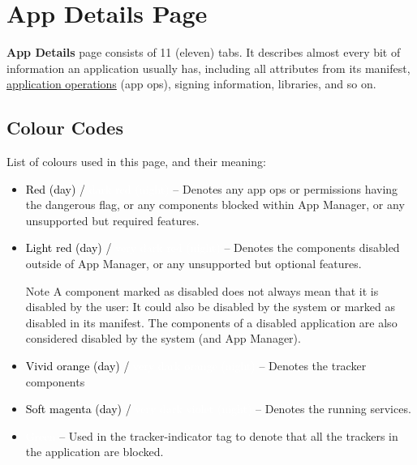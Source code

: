 \section{App Details Page}\label{sec:app-details-page} %
\textbf{App Details} page consists of 11 (eleven) tabs. It describes almost every bit of information
an application usually has, including all attributes from its manifest,
\hyperref[ch:app-ops]{application operations} (app ops), signing information, libraries, and so on.

\subsection{Colour Codes}\label{subsec:app-details-colour-codes} %
List of colours used in this page, and their meaning:
\begin{itemize}
    \item \colorbox{uninstalled-day}{\textcolor{black}{Red (day)}} / \colorbox{uninstalled-night}{\textcolor{white}{dark red (night)}}
    -- Denotes any app ops or permissions having the dangerous flag, or any components blocked
    within App Manager, or any unsupported but required features.

    \item \colorbox{disabled-day}{\textcolor{black}{Light red (day)}} / \colorbox{disabled-night}{\textcolor{white}{very
    dark red (night)}} -- Denotes the components disabled outside of App Manager, or any unsupported
    but optional features.

    \begin{tip}{Note}
        A component marked as disabled does not always mean that it is disabled by the user: It could also be disabled
        by the system or marked as disabled in its manifest. The components of a disabled application are also
        considered disabled by the system (and App Manager).
    \end{tip}

    \item \colorbox{tracker-day}{\textcolor{black}{Vivid orange (day)}} / \colorbox{tracker-night}{
        \textcolor{white}{very dark orange (night)}} -- Denotes the tracker components

    \item \colorbox{AMSoftMagenta}{\textcolor{black}{Soft magenta (day)}} / \colorbox{AMVeryDarkViolet}{
        \textcolor{white}{very dark violet (night)}} -- Denotes the running services.

    \item \colorbox{AMGreen}{\textcolor{white}{Green}}  -- Used in the tracker-indicator tag
    to denote that all the trackers in the application are blocked.
\end{itemize}

